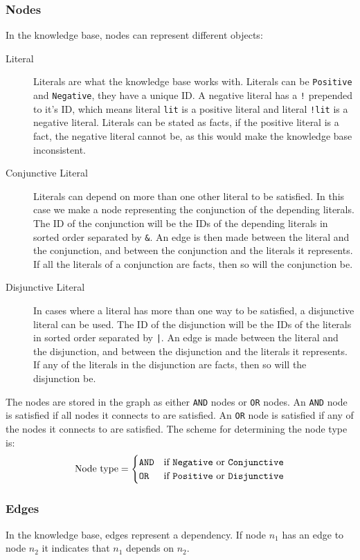 \documentclass[11pt]{article}
\begin{document}
\subsubsection{Nodes}
In the knowledge base, nodes can represent different objects:
\begin{description}
	\item[Literal] Literals are what the knowledge base works with. Literals can be {\tt Positive} and {\tt Negative}, they have a unique ID. A negative literal has a {\tt !} prepended to it's ID, which means literal {\tt lit} is a positive literal and literal {\tt !lit} is a negative literal. Literals can be stated as facts, if the positive literal is a fact, the negative literal cannot be, as this would make the knowledge base inconsistent.
	
	\item[Conjunctive Literal] Literals can depend on more than one other literal to be satisfied. In this case we make a node representing the conjunction of the depending literals. The ID of the conjunction will be the IDs of the depending literals in sorted order separated by {\tt \&}. An edge is then made between the literal and the conjunction, and between the conjunction and the literals it represents. If all the literals of a conjunction are facts, then so will the conjunction be.
	
	\item[Disjunctive Literal] In cases where a literal has more than one way to be satisfied, a disjunctive literal can be used. The ID of the disjunction will be the IDs of the literals in sorted order separated by {\tt |}. An edge is made between the literal and the disjunction, and between the disjunction and the literals it represents. If any of the literals in the disjunction are facts, then so will the disjunction be.
\end{description}

The nodes are stored in the graph as either {\tt AND} nodes or {\tt OR} nodes. An {\tt AND} node is satisfied if all nodes it connects to are satisfied. An {\tt OR} node is satisfied if any of the nodes it connects to are satisfied. The scheme for determining the node type is:
$$
\text{Node type} = \begin{cases}
  {\text{\tt AND}} & \text{if {\tt Negative} or {\tt Conjunctive}} \\
  {\text {\tt OR}} & \text{if {\tt Positive} or {\tt Disjunctive}}
\end{cases}
$$

\subsubsection{Edges}
In the knowledge base, edges represent a dependency. If node $n_1$ has an edge to node $n_2$ it indicates that $n_1$ depends on $n_2$.
\end{document}
